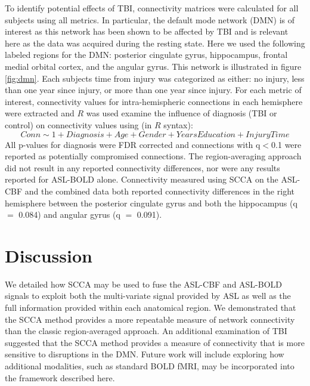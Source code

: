 \documentclass{llncs}
\begin{document}
 To identify potential effects of TBI, connectivity matrices were calculated for all subjects using all metrics. In particular, the default mode network (DMN) is of interest as this network has been shown to be affected by TBI \cite{Johnson2012} and is relevant here as the data was acquired during the resting state. Here we used the following labeled regions for the DMN: posterior cingulate gyrus, hippocampus, frontal medial orbital cortex, and the angular gyrus. This network is illustrated in figure \ref{fig:dmn}. Each subjects time from injury was categorized as either: no injury, less than one year since injury, or more than one year since injury. For each metric of interest, connectivity values for intra-hemispheric connections in each hemisphere were extracted and $R$ was used examine the influence of diagnosis (TBI or control) on connectivity values using (in $R$ syntax):
\begin{equation}
Conn \sim 1 + Diagnosis + Age + Gender + YearsEducation + InjuryTime
\end{equation}
All p-values for diagnosis were FDR corrected and connections with q$<$0.1 were reported as potentially compromised connections. The region-averaging approach did not result in any reported connectivity differences, nor were any results reported for ASL-BOLD alone. Connectivity measured using SCCA on the ASL-CBF and the combined data both reported connectivity differences in the right hemisphere between the posterior cingulate gyrus and both the hippocampus (q $=$ 0.084) and angular gyrus (q $=$ 0.091).
 

\section{Discussion}
We detailed how SCCA may be used to fuse the ASL-CBF and ASL-BOLD signals to exploit both the multi-variate signal provided by ASL as well as the full information provided within each anatomical region. We demonstrated that the SCCA method provides a more repeatable measure of network connectivity than the classic region-averaged approach. An additional examination of TBI suggested that the SCCA method provides a measure of connectivity that is more sensitive to disruptions in the DMN.  Future work will include exploring how additional modalities, such as standard BOLD fMRI, may be incorporated into the framework described here.
\end{document}
